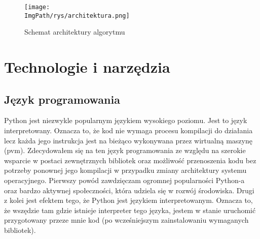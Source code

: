 \documentclass[a4paper,12pt,twoside,openany]{report}
\newcommand{\ImgPath}{.}
\begin{document}
    \begin{figure}[!htbp]
      \begin{center}
    \centering
    \texttt{[image: \\ImgPath/rys/architektura.png]}
    \end{center}
      \caption{Schemat architektury algorytmu}
      \label{schematArchitektury}
    \end{figure}

\chapter{Technologie i narzędzia}
  \section{Język programowania}
    Python jest niezwykle popularnym językiem wysokiego poziomu.
    Jest to język interpretowany. Oznacza to, że kod nie wymaga procesu kompilacji 
    do działania lecz każda jego instrukcja jest na bieżąco wykonywana przez wirtualną maszynę (pvm).
    Zdecydowałem się na ten język programowania ze względu na szerokie wsparcie w postaci 
    zewnętrznych bibliotek oraz możliwość przenoszenia kodu bez potrzeby ponownej jego kompilacji 
    w przypadku zmiany architektury systemu operacyjnego. Pierwszy powód zawdzięczam ogromnej 
    popularności Python-a oraz bardzo aktywnej społeczności, która udziela się w rozwój środowiska.
    Drugi z kolei jest efektem tego, że Python jest językiem interpretowanym. Oznacza to, że wszędzie tam 
    gdzie istnieje interpreter tego języka, jestem w stanie uruchomić przygotowany przeze mnie kod
    (po wcześniejszym zainstalowaniu wymaganych bibliotek).
\end{document}
